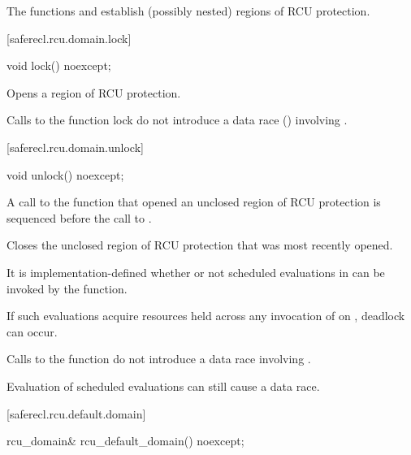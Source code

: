 The functions  and  establish (possibly nested)
regions of RCU protection.

[saferecl.rcu.domain.lock]{}

\begin{itemdecl}
void lock() noexcept;
\end{itemdecl}

\begin{itemdescr}

\pnum
\effects
Opens a region of RCU protection.

\pnum
\remarks
Calls to the function lock do not introduce a data race
() involving .

\end{itemdescr}

[saferecl.rcu.domain.unlock]{}

\begin{itemdecl}
void unlock() noexcept;
\end{itemdecl}

\begin{itemdescr}

\pnum
\expects
A call to the function  that opened
an unclosed region of RCU protection is sequenced before the
call to .

\pnum
\effects
Closes the unclosed region of RCU protection that was
most recently opened.

\pnum
\remarks
It is implementation-defined whether or not scheduled
evaluations in  can be invoked by the 
function.
\begin{note}
If such evaluations acquire resources held across any invocation
of  on , deadlock can occur.
\end{note}
Calls to the function  do not introduce a data race
involving .
\begin{note}
Evaluation of scheduled evaluations can still cause a data race.
\end{note}

\end{itemdescr}

[saferecl.rcu.default.domain]{}

\begin{itemdecl}
rcu_domain& rcu_default_domain() noexcept;
\end{itemdecl}

